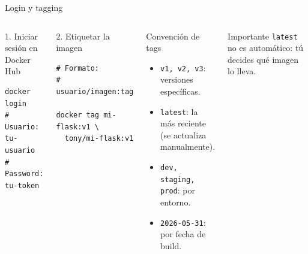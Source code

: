 \documentclass[aspectratio=169]{beamer}
\begin{document}
\begin{frame}[fragile]{Login y tagging}
  \scriptsize
  \begin{columns}[T]
    \begin{block}{1. Iniciar sesión en Docker Hub}
\begin{lstlisting}[style=terminal, basicstyle=\ttfamily\tiny]
docker login
# Usuario: tu-usuario
# Password: tu-token
\end{lstlisting}
    \end{block}
    \vspace{-0.05cm}
    \begin{block}{2. Etiquetar la imagen}
\begin{lstlisting}[style=terminal, basicstyle=\ttfamily\tiny]
# Formato:
# usuario/imagen:tag

docker tag mi-flask:v1 \
  tony/mi-flask:v1
\end{lstlisting}
    \end{block}
    \begin{exampleblock}{Convención de tags}
      \begin{itemize}
        \item \texttt{v1, v2, v3}: versiones específicas.
        \item \texttt{latest}: la más reciente (se actualiza manualmente).
        \item \texttt{dev, staging, prod}: por entorno.
        \item \texttt{2026-05-31}: por fecha de build.
      \end{itemize}
    \end{exampleblock}
    \begin{alertblock}{Importante}
      \texttt{latest} no es automático: tú decides qué imagen lo lleva.
    \end{alertblock}
  \end{columns}
\end{frame}
\end{document}
